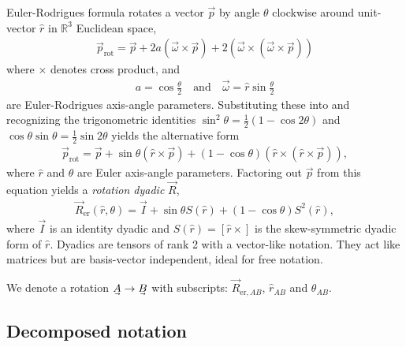 Euler-Rodrigues formula rotates a vector $\vec{p}$ by angle $\theta$ clockwise around unit-vector $\hat{r}$ in $\mathbb{R}^3$ Euclidean space,
%
\begin{align}\label{IV_eq_euler_rodrigues_free}
\vec{p}_\mathrm{rot} =  \vec{p} + 2a(\vec{\omega}\times\vec{p}) + 2(\vec\omega \times (\vec\omega \times \vec{p}))
\end{align}
%
where $\times$ denotes cross product, and
%
\begin{align}\label{IV_eq_euler_rodrigues_parameters}
a = \cos\frac{\theta}{2} \quad \text{and} \quad
\vec\omega = \hat{r}\sin\frac{\theta}{2}
\end{align}
%
are Euler-Rodrigues axis-angle parameters. Substituting these into  and recognizing the trigonometric identities $\sin^2\theta = \frac{1}{2}(1-\cos2\theta)$ and $\cos\theta\sin\theta=\frac{1}{2}\sin2\theta$ yields the alternative form
%
\begin{align}\label{IV_eq_euler_rodrigues2}
\vec{p}_\mathrm{rot} =  \vec{p} + \sin\theta(\hat{r}\times\vec{p}) + (1-\cos\theta)(\hat{r} \times (\hat{r} \times \vec{p})),
\end{align}
%
where $\hat{r}$ and $\theta$ are Euler axis-angle parameters. Factoring out $\vec{p}$ from this equation yields a \emph{rotation dyadic} $\vec{R}$,
%
\begin{align}\label{IV_eq_euler_rodrigues2}
\vec{R}_{\mathrm{er}}(\hat{r},\theta) =  \vec{I} + \sin\theta{}S(\hat{r}) + (1-\cos\theta)S^2(\hat{r}),
\end{align}
%
where $\vec{I}$ is an identity dyadic and $S(\hat{r}) = [\hat{r}\times]$ is the skew-symmetric dyadic form of $\hat{r}$. Dyadics are tensors of rank 2 with a vector-like notation. They act like matrices but are basis-vector independent, ideal for free notation. 

We denote a rotation $\uvec{A}\to\uvec{B}$ with subscripts: $\vec{R}_{\mathrm{er},AB}$, $\hat{r}_{AB}$ and $\theta_{AB}$.

\subsection{Decomposed notation}\label{IV_sec:euler_rodrigues_decomposed}

